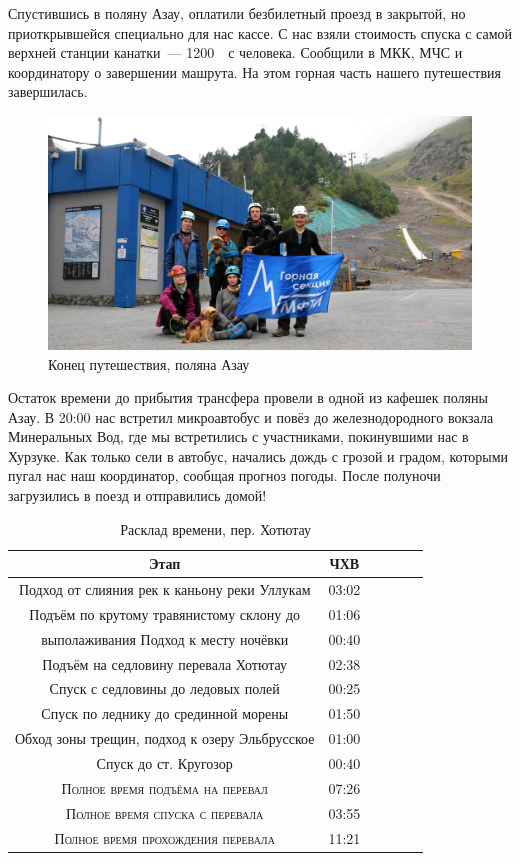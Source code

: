 Спустившись в поляну Азау, оплатили безбилетный проезд в закрытой, но приоткрывшейся специально для нас кассе. С нас взяли стоимость спуска с самой верхней станции канатки~--- 1200~\faRub~с человека. Сообщили в МКК, МЧС и координатору о завершении машрута. На этом горная часть нашего путешествия завершилась.

\begin{figure}[h!]
	\centering
	\includegraphics[width=0.7\linewidth]{../pics/group_finish.jpg}
	\caption{Конец путешествия, поляна Азау}
	\label{fig:group_finish}
\end{figure}

Остаток времени до прибытия трансфера провели в одной из кафешек поляны Азау.
В 20:00 нас встретил микроавтобус и повёз до железнодородного вокзала Минеральных Вод, где мы встретились с участниками, покинувшими нас в Хурзуке. Как только сели в автобус, начались дождь с грозой и градом, которыми пугал нас наш координатор, сообщая прогноз погоды. После полуночи загрузились в поезд и отправились домой!


\begin{table}[h!]
	\centering
	\begin{tabular}{|c|c|c|c|c|c|} 
		\hline 
		Этап & ЧХВ \\ 	
		\hline 
		Подход от слияния рек к каньону реки Уллукам		& 03:02\\
		Подъём по крутому травянистому склону до& 01:06 \\ выполаживания 
		Подход к месту ночёвки & 00:40 \\
		Подъём на седловину перевала Хотютау & 02:38\\
		Спуск с седловины до ледовых полей& 00:25\\
		Спуск по леднику до срединной морены & 01:50\\
		Обход зоны трещин, подход к озеру Эльбрусское& 01:00\\
		Спуск до ст. Кругозор & 00:40 \\
			
		\hline
		\textsc{Полное время подъёма на перевал  }& 07:26\\
		\textsc{Полное время спуска с перевала }& 03:55 \\
		\textsc{Полное время прохождения перевала }& 11:21 \\
		\hline
	\end{tabular}
	\caption{Расклад времени, пер. Хотютау}
\end{table}

